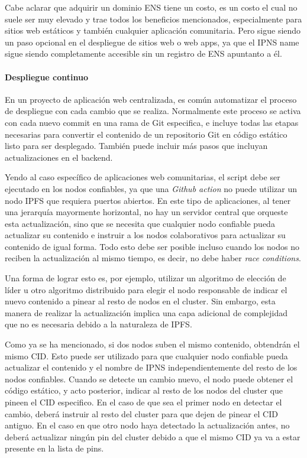 Cabe aclarar que adquirir un dominio ENS tiene un costo, es un costo el cual no suele ser muy elevado y trae todos los beneficios mencionados, especialmente para sitios web estáticos y también cualquier aplicación comunitaria. Pero sigue siendo un paso opcional en el despliegue de sitios web o web apps, ya que el IPNS name sigue siendo completamente accesible sin un registro de ENS apuntanto a él.

\paragraph{Despliegue continuo}

En un proyecto de aplicación web centralizada, es común automatizar el proceso de despliegue con cada cambio que se realiza. Normalmente este proceso se activa con cada nuevo commit en una rama de Git especifica, e incluye todas las etapas necesarias para convertir el contenido de un repositorio Git en código estático listo para ser desplegado. También puede incluir más pasos que incluyan actualizaciones en el backend.

Yendo al caso específico de aplicaciones web comunitarias, el script debe ser ejecutado en los nodos confiables, ya que una \textit{Github action} no puede utilizar un nodo IPFS que requiera puertos abiertos. En este tipo de aplicaciones, al tener una jerarquía mayormente horizontal, no hay un servidor central que orqueste esta actualización, sino que se necesita que cualquier nodo confiable pueda actualizar su contenido e instruir a los nodos colaborativos para actualizar su contenido de igual forma. Todo esto debe ser posible incluso cuando los nodos no reciben la actualización al mismo tiempo, es decir, no debe haber \textit{race conditions}.

Una forma de lograr esto es, por ejemplo, utilizar un algoritmo de elección de líder u otro algoritmo distribuido para elegir el nodo responsable de indicar el nuevo contenido a pinear al resto de nodos en el cluster. Sin embargo, esta manera de realizar la actualización implica una capa adicional de complejidad que no es necesaria debido a la naturaleza de IPFS.

Como ya se ha mencionado, si dos nodos suben el mismo contenido, obtendrán el mismo CID. Esto puede ser utilizado para que cualquier nodo confiable pueda actualizar el contenido y el nombre de IPNS independientemente del resto de los nodos confiables. Cuando se detecte un cambio nuevo, el nodo puede obtener el código estático, y acto posterior, indicar al resto de los nodos del cluster que pineen el CID especifico. En el caso de que sea el primer nodo en detectar el cambio, deberá instruir al resto del cluster para que dejen de pinear el CID antiguo. En el caso en que otro nodo haya detectado la actualización antes, no deberá actualizar ningún pin del cluster debido a que el mismo CID ya va a estar presente en la lista de pins.

